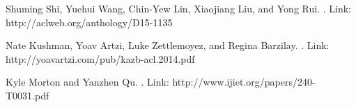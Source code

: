 \documentclass[11pt]{article}
\begin{document}
%
%
%
\begin{thebibliography}{}
Shuming Shi, Yuehui Wang, Chin-Yew Lin, Xiaojiang Liu, and Yong Rui.
. Link: http://aclweb.org/anthology/D15-1135

Nate Kushman, Yoav Artzi, Luke Zettlemoyez, and Regina Barzilay.
. Link: http://yoavartzi.com/pub/kazb-acl.2014.pdf

Kyle Morton and Yanzhen Qu.
. Link: http://www.ijiet.org/papers/240-T0031.pdf
\end{thebibliography}
\end{document}
